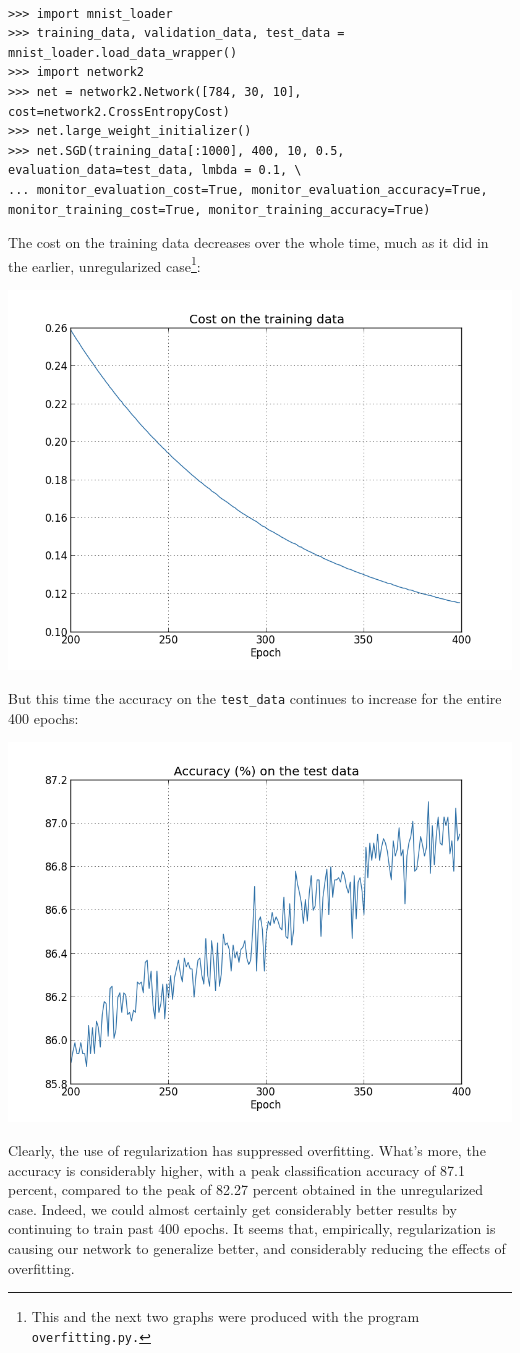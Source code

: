 \documentclass[a4paper,twoside,10pt]{book}
\begin{document}
\begin{lstlisting}

>>> import mnist_loader 
>>> training_data, validation_data, test_data =  mnist_loader.load_data_wrapper() 
>>> import network2 
>>> net = network2.Network([784, 30, 10], cost=network2.CrossEntropyCost)
>>> net.large_weight_initializer()
>>> net.SGD(training_data[:1000], 400, 10, 0.5, evaluation_data=test_data, lmbda = 0.1, \
... monitor_evaluation_cost=True, monitor_evaluation_accuracy=True, monitor_training_cost=True, monitor_training_accuracy=True)

\end{lstlisting}
The cost on the training data decreases over the whole time, much as it did in the earlier, unregularized case\footnote{This and the next two graphs were produced with the program \texttt{overfitting.py.}}:
\begin{center}
	\includegraphics[width=0.7\linewidth]{figures/ch3/regularized1}
\end{center}
But this time the accuracy on the \texttt{test\_data} continues to increase for the entire 400 epochs:
\begin{center}
	\includegraphics[width=0.7\linewidth]{figures/ch3/regularized2}
\end{center}
Clearly, the use of regularization has suppressed overfitting. What's more, the accuracy is considerably higher, with a peak classification accuracy of 87.1 percent, compared to the peak of 82.27 percent obtained in the unregularized case. Indeed, we could almost certainly get considerably better results by continuing to train past 400 epochs. It seems that, empirically, regularization is causing our network to generalize better, and considerably reducing the effects of overfitting.
\end{document}
